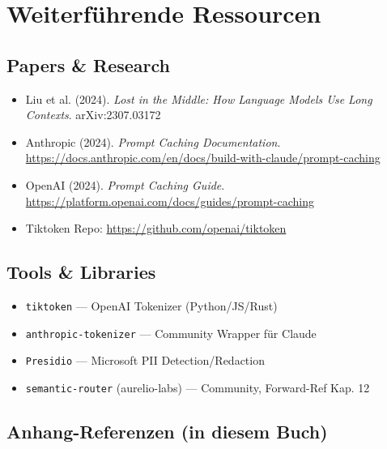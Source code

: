 \section{Weiterführende Ressourcen}
\label{sec:further_reading}

\subsection{Papers \& Research}
\label{sec:papers}

\begin{itemize}[leftmargin=*]
  \item Liu et al. (2024). \textit{Lost in the Middle: How Language Models Use Long Contexts}. arXiv:2307.03172
  \item Anthropic (2024). \textit{Prompt Caching Documentation}. \url{https://docs.anthropic.com/en/docs/build-with-claude/prompt-caching}
  \item OpenAI (2024). \textit{Prompt Caching Guide}. \url{https://platform.openai.com/docs/guides/prompt-caching}
  \item Tiktoken Repo: \url{https://github.com/openai/tiktoken}
\end{itemize}

\subsection{Tools \& Libraries}
\label{sec:tools}

\begin{itemize}[leftmargin=*]
  \item \texttt{tiktoken} --- OpenAI Tokenizer (Python/JS/Rust)
  \item \texttt{anthropic-tokenizer} --- Community Wrapper für Claude
  \item \texttt{Presidio} --- Microsoft PII Detection/Redaction
  \item \texttt{semantic-router} (aurelio-labs) --- Community, Forward-Ref Kap. 12
\end{itemize}

\subsection{Anhang-Referenzen (in diesem Buch)}
\label{sec:appendix_refs}

